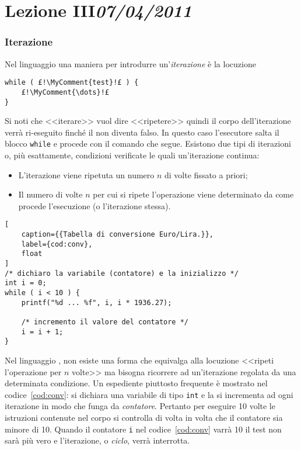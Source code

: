 \chapter[Lezione III]{Lezione III\newline\small{\emph{07/04/2011}}}
	\subsection{Iterazione}
	\label{sec:it}


Nel linguaggio  una maniera per introdurre un'\emph{iterazione} è la locuzione
\begin{lstlisting}
while ( £!\MyComment{test}!£ ) {
	£!\MyComment{\dots}!£
}
\end{lstlisting}
Si noti che <<iterare>> vuol dire <<ripetere>> quindi il corpo dell'iterazione verrà ri-eseguito finché il  non diventa falso.
In questo caso l'esecutore salta il blocco \lstinline!while! e procede con il comando che segue.
Esistono due tipi di iterazioni o, più esattamente, condizioni verificate le quali un'iterazione continua:
\begin{itemize}
	\item
L'iterazione viene ripetuta un numero $n$ di volte fissato a priori;
	\item
Il numero di volte $n$ per cui si ripete l'operazione viene determinato da come procede l'esecuzione (o l'iterazione stessa).
\end{itemize}


\begin{lstlisting}[
	caption={{Tabella di conversione Euro/Lira.}},
	label={cod:conv},
	float
]
/* dichiaro la variabile (contatore) e la inizializzo */
int i = 0; 
while ( i < 10 ) {
	printf("%d ... %f", i, i * 1936.27);

	/* incremento il valore del contatore */
	i = i + 1; 
}
\end{lstlisting}
Nel linguaggio , non esiste una forma che equivalga alla locuzione <<ripeti l'operazione per $n$ volte>> ma bisogna ricorrere ad un'iterazione regolata da una determinata condizione.
Un espediente piuttosto frequente è mostrato nel codice~\ref{cod:conv}: si dichiara una variabile di tipo \lstinline!int! e la si incrementa ad ogni iterazione in modo che funga da \emph{contatore}.
Pertanto per eseguire \num{10} volte le istruzioni contenute nel corpo si controlla di volta in volta che il contatore sia minore di \num{10}.
Quando il contatore \lstinline!i! nel codice~\ref{cod:conv} varrà \num{10} il test non sarà più vero e l'iterazione, o \emph{ciclo}, verrà interrotta.


